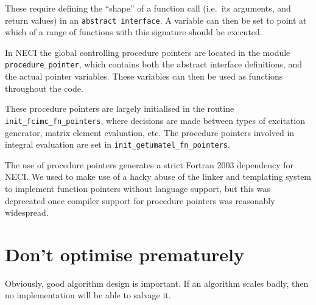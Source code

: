 \documentclass[a4paper,notitlepage]{scrreprt}
\newcommand\headitem[1]{\needspace{1.5\baselineskip}\item[{\boldmath #1 \nopagebreak}] \hfill \\ \nopagebreak}
\let\code\lstinline
\begin{document}
		These require defining the ``shape'' of a function call (i.e.\ its
		arguments, and return values) in an \code{abstract interface}. A
		variable can then be set to point at which of a range of functions
		with this signature should be executed.

		In NECI the global controlling procedure pointers are located in
		the module \code{procedure_pointer}, which contains both the abstract
		interface definitions, and the actual pointer variables. These
		variables can then be used as functions throughout the code.

		These procedure pointers are largely initialised in the routine
		\code{init_fcimc_fn_pointers}, where decisions are made between types
		of excitation generator, matrix element evaluation, etc. The procedure
		pointers involved in integral evaluation are set in
		\code{init_getumatel_fn_pointers}.

		The use of procedure pointers generates a strict Fortran 2003
		dependency for NECI. We used to make use of a hacky abuse of the
		linker and templating system to implement function pointers without
		language support, but this was deprecated once compiler support
		for procedure pointers was reasonably widespread.

%
%

\section{Don't optimise prematurely}
	Obviously, good algorithm design is important. If an algorithm scales
	badly, then no implementation will be able to salvage it.
\end{document}
